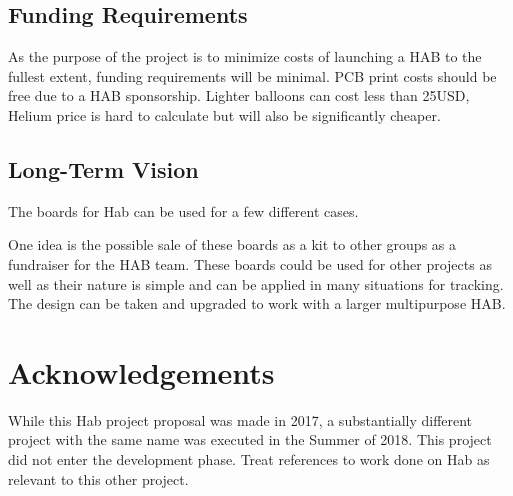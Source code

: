 \documentclass[conference]{IEEEtran} %
\begin{document}
\subsection{Funding Requirements}
As the purpose of the project is to minimize costs of launching a HAB to the
fullest extent, funding requirements will be minimal. PCB print costs should be
free due to a HAB sponsorship. Lighter balloons can cost less than 25USD, Helium
price is hard to calculate but will also be significantly cheaper.
\subsection{Long-Term Vision}
\label{sec:vision}
The boards for \textmu{}Hab can be used for a few different cases.

One idea is the possible sale of these boards as a kit to other groups as a
fundraiser for the HAB team.  These boards could be used for other projects as
well as their nature is simple and can be applied in many situations for
tracking. The design can be taken and upgraded to work with a larger
multipurpose HAB.

\section*{Acknowledgements}
While this \textmu{}Hab project proposal was made in 2017, a substantially different project with the same name was executed in the Summer of 2018.
This project did not enter the development phase.
Treat references to work done on \textmu{}Hab as relevant to this other project.
\end{document}
